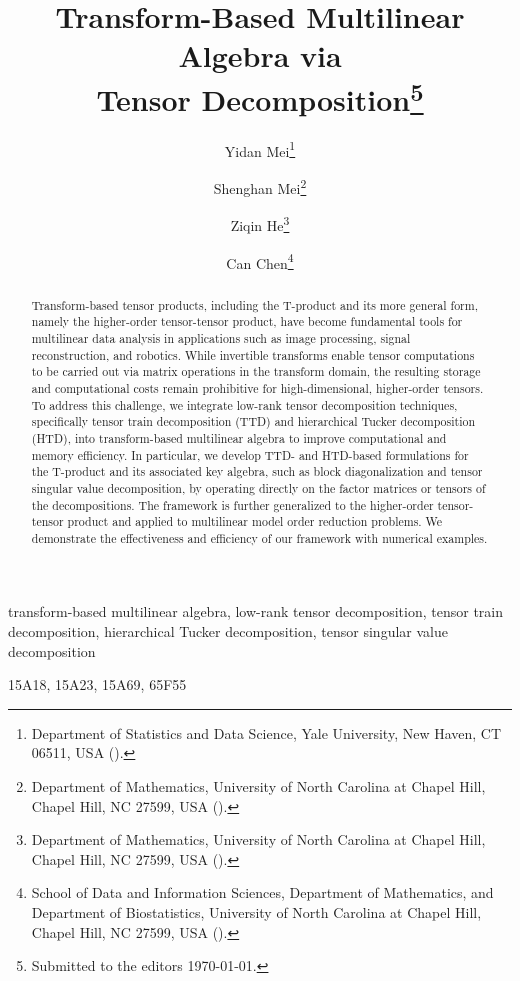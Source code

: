 \documentclass[onefignum,onetabnum]{siamart250211}
\title{Transform-Based Multilinear Algebra via \\ Tensor Decomposition\thanks{Submitted to the editors \today.
\funding{Funding information goes here.}}}
\author{
Yidan Mei\thanks{Department of Statistics and Data Science, Yale University, New Haven, CT 06511, USA (\email{yidan.mei@yale.edu}).}
\and Shenghan Mei\thanks{Department of Mathematics, University of North Carolina at Chapel Hill, Chapel Hill, NC 27599, USA (\email{shmei@unc.edu}).}
\and Ziqin He\thanks{Department of Mathematics, University of North Carolina at Chapel Hill, Chapel Hill, NC 27599, USA (\email{zhe21@unc.edu}).}
\and Can Chen\thanks{School of Data and Information Sciences, Department of Mathematics, and Department of Biostatistics, University of North Carolina at Chapel Hill, Chapel Hill, NC 27599, USA (\email{canc@unc.edu}).}}
\begin{document}
\maketitle
	
	
\begin{abstract}
Transform-based tensor products, including the T-product and its more general form, namely the higher-order tensor-tensor product, have become fundamental tools for multilinear data analysis in applications such as image processing, signal reconstruction, and robotics. While invertible transforms enable tensor computations to be carried out via matrix operations in the transform domain, the resulting storage and computational costs remain prohibitive for high-dimensional, higher-order tensors. To address this challenge, we integrate low-rank tensor decomposition techniques, specifically tensor train decomposition (TTD) and hierarchical Tucker decomposition (HTD), into transform-based multilinear algebra to improve computational and memory efficiency. In particular, we develop TTD- and HTD-based formulations for the T-product and its associated key algebra, such as block diagonalization and tensor singular value decomposition, by operating directly on the factor matrices or tensors of the decompositions. The framework is further generalized to the higher-order tensor-tensor product and applied to multilinear model order reduction problems. We demonstrate the effectiveness and efficiency of our framework with numerical examples. 
\end{abstract}
	
\begin{keywords}
transform-based multilinear algebra, low-rank tensor decomposition, tensor train decomposition, hierarchical Tucker decomposition, tensor singular value decomposition
\end{keywords}
	
\begin{MSCcodes}
15A18, 15A23, 15A69, 65F55
\end{MSCcodes}
\end{document}
